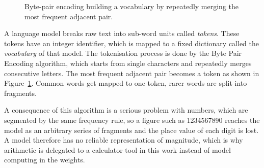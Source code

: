 \begin{figure}[H]
  \centering
  \caption{Byte-pair encoding building a vocabulary by repeatedly merging the most frequent adjacent pair.}
  \label{fig:bpe}
\end{figure}

A language model breaks raw text into sub-word units called \emph{tokens}. These tokens have an integer identifier, which is mapped to a fixed dictionary called the \emph{vocabulary} of that model. The tokenisation process is done by the Byte Pair Encoding algorithm, which starts from single characters and repeatedly merges consecutive letters. The most frequent adjacent pair becomes a token \cite{sennrich2016neuralmachinetranslationrare} as shown in Figure~\ref{fig:bpe}. Common words get mapped to one token, rarer words are split into fragments.

A consequence of this algorithm is a serious problem with numbers, which are segmented by the same frequency rule, so a figure such as 1234567890 reaches the model as an arbitrary series of fragments and the place value of each digit is lost. A model therefore has no reliable representation of magnitude, which is why arithmetic is delegated to a calculator tool in this work instead of model computing in the weights.

